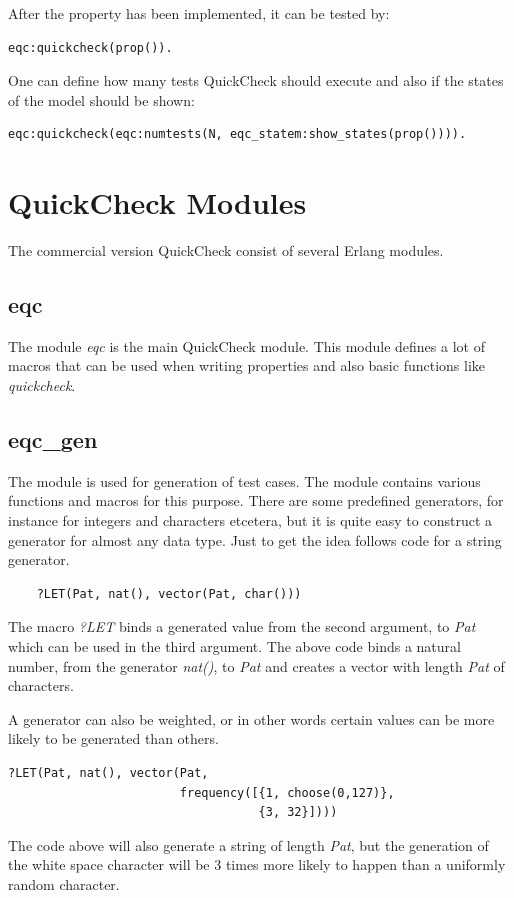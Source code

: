 After the property has been implemented, it can be tested by:

\begin{lstlisting}
eqc:quickcheck(prop()).
\end{lstlisting}

One can define how many tests QuickCheck should execute and also if the
states of the model should be shown:
\begin{lstlisting}
eqc:quickcheck(eqc:numtests(N, eqc_statem:show_states(prop()))).
\end{lstlisting}

\section{QuickCheck Modules}
The commercial version QuickCheck consist of several Erlang modules.
\subsection{eqc}
The module \emph{eqc} is the main QuickCheck module. This module defines a lot
of macros that can be used when writing properties and also basic functions
like \emph{quickcheck}.

\subsection{eqc\_gen} The module is used for generation of test cases. The module
contains various functions and macros for this purpose. There are some
predefined generators, for instance for integers and characters etcetera, but it
is quite easy to construct a generator for almost any data type. Just to get the
idea follows code for a string generator.
\begin{lstlisting}
    ?LET(Pat, nat(), vector(Pat, char()))
\end{lstlisting}
The macro \emph{?LET} binds a generated value from the second argument, to \emph{Pat} which can be
used in the third argument. The above code binds a natural number, from the
generator \emph{nat()}, to \emph{Pat} and creates a vector with length
\emph{Pat} of characters.

A generator can also be weighted, or in other words certain values can be more
likely to be generated than others.

\begin{lstlisting}
?LET(Pat, nat(), vector(Pat,
                        frequency([{1, choose(0,127)},
                                   {3, 32}])))
\end{lstlisting}
The code above will also generate a string of length \emph{Pat}, but the
generation of the white space character will be 3 times more likely to happen
than a uniformly random character.

